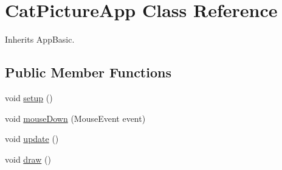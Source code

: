 \hypertarget{class_cat_picture_app}{\section{Cat\-Picture\-App Class Reference}
\label{class_cat_picture_app}
}


Inherits App\-Basic.

\subsection*{Public Member Functions}
\begin{DoxyCompactItemize}
\item 
void \hyperlink{class_cat_picture_app_aa3fe58629bb0ca19720164418f59b7fb}{setup} ()
\item 
void \hyperlink{class_cat_picture_app_a084dbb9c1a964c2d37d0661487daa710}{mouse\-Down} (Mouse\-Event event)
\item 
void \hyperlink{class_cat_picture_app_a654167e69d6d1db91773a33ce4b39073}{update} ()
\item 
void \hyperlink{class_cat_picture_app_a935014656a1dc2af9f127c6f14841ef8}{draw} ()
\end{DoxyCompactItemize}


